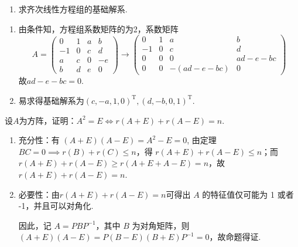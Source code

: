 \begin{exercise}
\begin{exgroup}
\begin{enumerate}
            \item 求齐次线性方程组的基础解系.
        \end{enumerate}
        \begin{answer}
            \begin{enumerate}
                \item 由条件知，方程组系数矩阵的为2，系数矩阵
                      \[ A=\begin{pmatrix}
                              0  & 1 & a & b  \\
                              -1 & 0 & c & d  \\
                              a  & c & 0 & -e \\
                              b  & d & e & 0
                          \end{pmatrix}\rightarrow
                          \begin{pmatrix}
                              0  & 1 & a          & b       \\
                              -1 & 0 & c          & d       \\
                              0  & 0 & 0          & ad-e-bc \\
                              0  & 0 & -(ad-e-bc) & 0
                          \end{pmatrix} \]
                      故$ad-e-bc=0$.

                \item 易求得基础解系为$(c,-a,1,0)^\mathrm{T},(d,-b,0,1)^\mathrm{T}$.
            \end{enumerate}
        \end{answer}
    \end{exgroup}

    \begin{exgroup}
        \item 设$A$为方阵，证明：$A^2=E \iff r(A+E)+r(A-E)=n$.
        \begin{answer}
        \begin{enumerate}
            \item 充分性：有 $(A+E)(A-E) = A^2 - E = 0$, 由定理 $BC=0 \implies r(B)+r(C) \leqslant n$，得 $r(A+E)+r(A-E) \leqslant n$；而 $r(A+E)+r(A-E) \geqslant r(A+E+A-E) = n$，故 $r(A+E)+r(A-E)=n$.
            \item 必要性：由$r(A+E)+r(A-E)=n$可得出 $A$ 的特征值仅可能为 1 或者 -1，并且可以对角化.

                因此，记 $A = PBP^{-1}$，其中 $B$ 为对角矩阵，则 $(A+E)(A-E)=P(B-E)(B+E)P^{-1}=0$，故命题得证.
        \end{enumerate}
        \end{answer}


\end{exgroup}
\end{exercise}
